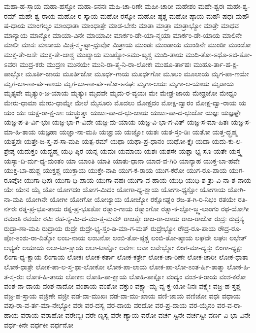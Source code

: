 {ಮಹಾ-ಹ-ಸ್ತಾಯ
ಮಹಾ-ಹಸ್ತೋ
ಮಹಾ-ಽನನಃ
ಮಹಿ-ಚಾ-ರಿಣೇ
ಮಹೀ-ಚಾರೀ
ಮಹೇಶಂ
ಮಹೇ-ಶ್ವರಃ
ಮಹೇ-ಶ್ವ-ರಮ್
ಮಹೇ-ಶ್ವ-ರಾಯ
ಮಹೋ-ರ-ಸ್ಕಾಯ
ಮಹೋ-ರಸ್ಕೋ
ಮಹೋ-ಷ್ಠಶ್ಚ
ಮಹೋ-ಷ್ಠಾಯ
ಮಹೌ-ಷಧಃ
ಮಹೌ-ಷ-ಧಾಯ
ಮಾಂಗಲ್ಯಂ
ಮಾಂಧಾತಾ
ಮಾಂಧಾತ್ರೇ
ಮಾಡ-ಬೇಕು
ಮಾತಾ
ಮಾತ್ರಾ
ಮಾತ್ರಾಭ್ಯೋ
ಮಾತ್ರೇ
ಮಾಧವ
ಮಾನ್ಯಾಯ
ಮಾನ್ಯೋ
ಮಾಯಾ-ವಿನೇ
ಮಾಯಾವೀ
ಮಾರ್ಕಂ-ಡೇ-ಯಾ-ನ್ಮಯಾ
ಮಾರ್ಕಂ-ಡೇ-ಯಾಯ
ಮಾಲಿನೇ
ಮಾಲೀ
ಮಾಸಃ
ಮಾಸಾಯ
ಮಿತ್ರ-ಸ್ತ್ವ-ಷ್ಟಾ-ಧ್ರುವೋ
ಮಿತ್ರಾಯ
ಮುಂಡಃ
ಮುಂಡಾಯ
ಮುಂಡಿನೇ
ಮುಂಡೀ
ಮುಂಡೋ
ಮುಕ್ತ-ತೇ-ಜಸೇ
ಮುಕ್ತ-ತೇ-ಜಾಶ್ಚ
ಮುಖ್ಯಾಯ
ಮುಖ್ಯೋ-ಽಮು-ಖ್ಯಶ್ಚ
ಮುದಿ-ತಾಯ
ಮುದಿ-ತೋ-ಽಥೊ-ಽಜಿ-ತೋ-ಽವರಃ
ಮುದ್ರ-ಕರು
ಮುದ್ರಣ
ಮುನಯೇ
ಮುನಿ-ರಾ-ತ್ಮ-ನಿ-ರಾ-ಲೋಕಃ
ಮುಹೂ-ರ್ತಾಹಃ
ಮುಹೂ-ರ್ತಾ-ಹ-ಕ್ಷ-ಪಾಭ್ಯೋ
ಮೂರ್ತಿ-ಜಾಯ
ಮೂರ್ತಿಜೋ
ಮೂರ್ಧ-ಗಾಯ
ಮೂರ್ಧಗೋ
ಮೂಲಂ
ಮೂಲಾಯ
ಮೃಗ-ಪಾ-ಣಯೇ
ಮೃಗ-ಬಾ-ಣಾ-ರ್ಪ-ಣಾಯ
ಮೃಗ-ಬಾ-ಣಾ-ರ್ಪ-ಣೋ-ಽನಘಃ
ಮೃಗಾ-ಲಯಃ
ಮೃಗಾ-ಲ-ಯಾಯ
ಮೃಡಾಯ
ಮೃತ್ಯವೇ
ಮೃತ್ಯುಂ-ಜ-ಯಾಯ
ಮೃತ್ಯುಃ
ಮೃದವೇ
ಮೃದು-ರ-ವ್ಯಯಃ
ಮೇ
ಮೇಢ್ರ-ಜಾಯ
ಮೇಢ್ರಜೋ
ಮೇಧ್ಯಂ
ಮೇರು-ಧಾಮಾ
ಮೇರು-ಧಾಮ್ನೇ
ಮೇಲೆ
ಮೈಸೂರು
ಮೊದಲು
ಮೋಕ್ಷದಂ
ಮೋಕ್ಷ-ದ್ವಾರಂ
ಮೋಕ್ಷ-ದ್ವಾ-ರಾಯ
ಯ
ಯಂ
ಯಃ
ಯಕ್ಷ-ರಾ-ಕ್ಷ-ಸಾಃ
ಯಚ್ಛ್ರುತ್ವಾ
ಯಜುಃ-ಪಾ-ದ-ಭು-ಜಾಯ
ಯಜುಃ-ಪಾ-ದ-ಭುಜೋ
ಯಜ್ಞಃ
ಯಜ್ಞಘ್ನೇ
ಯಜ್ಞ-ಪ-ತಿ-ರ್ವಿ-ಭುಃ
ಯಜ್ಞ-ಭಾ-ಗ-ವಿದೇ
ಯಜ್ಞ-ಮ-ಯಾಯ
ಯಜ್ಞ-ವಿ-ಭಾ-ಗ-ವಿತ್
ಯಜ್ಞ-ಸ-ಮಾ-ಹಿತಃ
ಯಜ್ಞ-ಸ-ಮಾ-ಹಿ-ತಾಯ
ಯಜ್ಞಹಾ
ಯಜ್ಞಾ-ನಾ-ಮಪಿ
ಯಜ್ಞಾಯ
ಯಜ್ಞೋ
ಯತಃ
ಯತ-ಸ್ತಂ-ಡಿಃ
ಯತೋ
ಯತ್ತ-ದ್ಬ್ರಹ್ಮ
ಯತ್ತಪಃ
ಯತ್ತೇ-ಜ-ಸ್ತ-ಪ-ಸಾ-ಮಪಿ
ಯತ್ಪ-ರಮ್
ಯಥಾ
ಯಥಾ-ಪ್ರ-ಧಾನಂ
ಯಥೋ-ಕ್ತೈಃ
ಯದಾ
ಯದು-ಕು-ಲ-ಶ್ರೇಷ್ಠ
ಯದುಕ್ತಂ
ಯದ್ಬ್ರಹ್ಮ
ಯಧಿ-ಷ್ಠಿರ
ಯನ್ನ
ಯಮಃ
ಯಮಾಯ
ಯಶಃ
ಯಶಸೇ
ಯಶ್ಚಾ-ಭ್ಯ-ಸೂ-ಯತೇ
ಯಸ್ತ್ವ
ಯಸ್ಯಾ-ದಿ-ರ್ಮ-ಧ್ಯ-ಮಂತಂ
ಯಾ
ಯಾಂತಿ
ಯಾತಿ
ಯಾತು-ಧಾನಾ
ಯಾದ-ವ-ಗಿರಿ
ಯಾನ್ಯಾಹ
ಯುಕ್ತ-ಬಾ-ಹವೇ
ಯುಕ್ತ-ಬಾ-ಹುಶ್ಚ
ಯುಕ್ತಶ್ಚ
ಯುಕ್ತಾಯ
ಯುಕ್ತೇ-ನಾಪಿ
ಯುಗ-ಕ-ರಾಯ
ಯುಗ-ಕರೋ
ಯುಗ-ರೂ-ಪಾಯ
ಯುಗ-ರೂಪೋ
ಯುಗಾ-ಧಿಪಃ
ಯುಗಾ-ಧಿ-ಪಾಯ
ಯುಗಾ-ವಹಃ
ಯುಗಾ-ವ-ಹಾಯ
ಯುಧಿ
ಯುಧಿ-ಶ-ತ್ರು-ವಿ-ನಾ-ಶ-ನಾಯ
ಯೇ
ಯೇನ
ಯೈ
ಯೋ
ಯೋಗದಂ
ಯೋಗ-ಮಿದಂ
ಯೋಗಾ-ಧ್ಯ-ಕ್ಷಾಯ
ಯೋಗಾ-ಧ್ಯಕ್ಷೋ
ಯೋಗಾಯ
ಯೋಗಿ-ನಾ-ಮಪಿ
ಯೋಗಿನೇ
ಯೋಗೀ
ಯೋಗೋ
ಯೋಜ್ಯಾಯ
ಯೋಜ್ಯೋ
ರಕ್ಷೋಘ್ನಂ
ರಜ-ತ-ಗಿ-ರಿ-ನಿಭಂ
ರತಯೇ
ರತಿ-ರ್ನರಃ
ರತ್ನ-ಪ್ರ-ಭೂ-ತಾಯ
ರತ್ನ-ಪ್ರ-ಭೂತೋ
ರತ್ನಾಂ-ಗಾಯ
ರತ್ನಾಂಗೋ
ರತ್ನಾ-ಕ-ಲ್ಪೋ-ಜ್ಜ್ವ-ಲಾಂಗಂ
ರಥ-ಯೋಗೀ
ರಮಂತಿ
ರವಯೇ
ರವಿಃ
ರಹ-ಸ್ಯ-ಮಿ-ದ-ಮು-ತ್ತ-ಮಮ್
ರಾಜತ್ವೇ
ರಾಜ-ರಾ-ಜಾಯ
ರಾಜ-ರಾಜೋ
ರುದ್ರಃ
ರುದ್ರಸ್ಯ
ರುದ್ರಾ-ಣಾ-ಮಪಿ
ರುದ್ರಾಯ
ರುದ್ರೇ
ರುದ್ರೇ-ಭ್ಯ-ಸ್ತಂ-ಡಿ-ಮಾ-ಗ-ಮತ್
ರುದ್ರೇಭ್ಯೋ
ರೌದ್ರ-ರೂ-ಪಾಯ
ರೌದ್ರ-ರೂ-ಪೋ-ಽಂಶು-ರಾ-ದಿತ್ಯೋ
ಲಂಬ-ನಾಯ
ಲಂಬನೋ
ಲಂಬಿ-ತೋ-ಷ್ಠಶ್ಚ
ಲಂಬಿ-ತೋ-ಷ್ಠಾಯ
ಲಘವೇ
ಲಘುಃ
ಲಭೇತ್
ಲಭ್ಯತೇ
ಲಯಾಯ
ಲಲಾ-ಟಾ-ಕ್ಷಾಯ
ಲಲಾ-ಟಾಕ್ಷೋ
ಲವಣಃ
ಲವಾ
ಲವೇಭ್ಯೋ
ಲಿಂಗ-ಮಾ-ದ್ಯಸ್ತು
ಲಿಂಗಾ-ಧ್ಯಕ್ಷಃ
ಲಿಂಗಾ-ಧ್ಯ-ಕ್ಷಾಯ
ಲಿಂಗಾಯ
ಲೋಕಃ
ಲೋಕ-ಕರ್ತಾ
ಲೋಕ-ಕರ್ತ್ರೇ
ಲೋಕ-ಚಾ-ರಿಣೇ
ಲೋಕ-ಚಾರೀ
ಲೋಕ-ಧಾತಾ
ಲೋಕ-ಧಾತ್ರೇ
ಲೋಕ-ಪಾ-ಲ-ಸ್ತ-ಥಾ-ಲೋಕೋ
ಲೋಕ-ಪಾ-ಲಾಯ
ಲೋಕ-ಪಾ-ಲೋ-ಽಂತ-ರ್ಹಿ-ತಾತ್ಮಾ
ಲೋಕ-ಹಿ-ತ-ಸ್ತ-ರುಃ
ಲೋಕ-ಹಿ-ತಾಯ
ಲೋಕಾಃ
ಲೋಹಿ-ತಾ-ಕ್ಷಾಯ
ಲೋಹಿ-ತಾಕ್ಷೋ
ವಂದ್ಯಂ
ವಂಶ-ಕ-ರಾಯ
ವಂಶ-ಕರೋ
ವಂಶ-ನಾ-ದಾಯ
ವಂಶ-ನಾದೋ
ವಂಶಾಯ
ವಂಶೋ
ವಕ್ತುಂ
ವಕ್ಷ್ಯಾ-ಮ್ಯ-ವ್ಯ-ಕ್ತ-ಯೋ-ನಿನಃ
ವಕ್ಷ್ಯೇ
ವಜ್ರ-ಹ-ಸ್ತಶ್ಚ
ವಜ್ರ-ಹ-ಸ್ತಾಯ
ವಜ್ರಿಣೇ
ವಜ್ರೀ
ವಡ-ವಾ-ಮುಖಃ
ವಡ-ವಾ-ಮು-ಖಾಯ
ವಣಿ-ಜಾಯ
ವಣಿಜೋ
ವಧಃ
ವಧಾಯ
ವಪು-ರಾ-ವ-ರ್ತ-ಮಾ-ನೇಭ್ಯೋ
ವರಃ
ವರ-ದಸ್ಯ
ವರ-ದಾಯ
ವರದೋ
ವರ-ಪ್ರ-ದಾಯ
ವರ-ಯೈನಂ
ವರ-ವ-ರಾ-ಹಾಯ
ವರಾಯ
ವರಾಹೋ
ವರೇಣ್ಯಃ
ವರೇ-ಣ್ಯಸ್ಯ
ವರೇ-ಣ್ಯಾಯ
ವರೋ
ವರ್ಚ-ಸ್ವಿನೇ
ವರ್ಚಸ್ವೀ
ವರ್ಣ-ವಿ-ಭಾ-ವಿನೇ
ವರ್ಧ-ಕಿನೇ
ವರ್ಧಕೀ
ವರ್ಧನೋ
}
